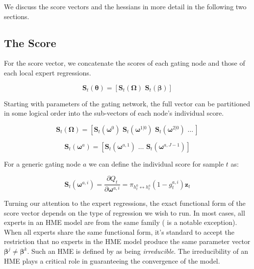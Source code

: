 \documentclass[12pt]{article}
\newcommand{\gateprod}[2]{\pi_{#1 \longleftrightarrow #2}}
\begin{document}
We discuss the score vectors and the hessians in more detail in the following
two sections.


\subsection{The Score}

For the score vector, we concatenate the scores of each gating node and those of each
local expert regressions.

\begin{equation}
  \boldsymbol{S}_{t}(\boldsymbol{\theta}) = [ \boldsymbol{S}_{t}(\boldsymbol{\Omega}) \,\, \boldsymbol{S}_{t}(\boldsymbol{\beta}) ]
\end{equation}

Starting with parameters of the gating network, the full vector can be partitioned 
in some logical order into the sub-vectors of each node's individual
score.

\begin{equation}
  \boldsymbol{S}_{t}(\boldsymbol{\Omega}) = [ \boldsymbol{S}_{t}(\boldsymbol{\omega}^{0}) \,\, \boldsymbol{S}_{t}(\boldsymbol{\omega}^{1 | 0}) \,\, \boldsymbol{S}_{t}(\boldsymbol{\omega}^{2 | 0}) \,\, \ldots \, ]
\end{equation}

\begin{equation}
  \boldsymbol{S}_{t}(\boldsymbol{\omega}^{a}) = [ \boldsymbol{S}_{t}(\boldsymbol{\omega}^{a, 1}) \,\, \ldots \,\, \boldsymbol{S}_{t}(\boldsymbol{\omega}^{a, J - 1}) ]
\end{equation}

For a generic gating node $a$ we can define the individual score for 
sample $t$ as:

\begin{equation} \label{eq:gateScore}
  \boldsymbol{S}_{t}(\boldsymbol{\omega}^{a, i}) = \frac{\partial Q_{t}}{\partial \boldsymbol{\omega}^{a,i}} = \gateprod{h^{0}_{t}}{h^{a}_{t}} (1 - g^{a, i}_{t}) \boldsymbol{z}_{t} 
\end{equation}




Turning our attention to the expert regressions, the exact functional form
of the score vector depends on the type of regression we wish to run. In most
cases, all experts in an HME model are from the same family
(\cite{HuertaJiangTanner2003} is a notable exception). When all experts share
the same functional form, it's standard to accept the restriction that no experts
in the HME model produce the same parameter vector
$\boldsymbol{\beta}^{j} \neq \boldsymbol{\beta}^{k}$. Such an HME is defined by
\cite{JiangTanner2000} as being \textit{irreducible}. The irreducibility of an HME
plays a critical role in guaranteeing the convergence of the model.
\end{document}
